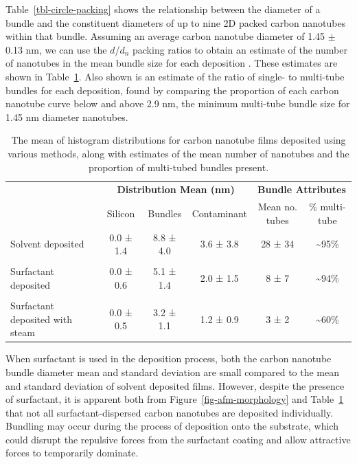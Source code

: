\documentclass[
  a4paper,
]{scrbook}
\begin{document}
Table~\ref{tbl-circle-packing} shows the relationship between the
diameter of a bundle and the constituent diameters of up to nine 2D
packed carbon nanotubes within that bundle. Assuming an average carbon
nanotube diameter of 1.45 \(\pm\) 0.13 nm, we can use the \(d\)/\(d_n\)
packing ratios to obtain an estimate of the number of nanotubes in the
mean bundle size for each deposition \autocite{Specht2023}. These
estimates are shown in Table~\ref{tbl-histogram-parameters}. Also shown
is an estimate of the ratio of single- to multi-tube bundles for each
deposition, found by comparing the proportion of each carbon nanotube
curve below and above 2.9 nm, the minimum multi-tube bundle size for
1.45 nm diameter nanotubes.

\hypertarget{tbl-histogram-parameters}{}
\begin{table}
\caption{\label{tbl-histogram-parameters}The mean of histogram distributions for carbon nanotube films deposited
using various methods, along with estimates of the mean number of
nanotubes and the proportion of multi-tubed bundles present. }\tabularnewline

\centering
\begin{tabular}{>{\raggedright\arraybackslash}p{2cm}ccccc}
\toprule
\multicolumn{1}{c}{\textbf{ }} & \multicolumn{3}{c}{\textbf{Distribution Mean (nm)}} & \multicolumn{2}{c}{\textbf{Bundle Attributes}} \\
\cmidrule(l{3pt}r{3pt}){2-4} \cmidrule(l{3pt}r{3pt}){5-6}
 & Silicon & Bundles & Contaminant & Mean no. tubes & \% multi-tube\\
\midrule
Solvent deposited & 0.0 ± 1.4 & 8.8 ± 4.0 & 3.6 ± 3.8 & 28 ± 34 & \textasciitilde{}95\%\\
 &  &  &  &  \vphantom{1} & \\
Surfactant deposited & 0.0 ± 0.6 & 5.1 ± 1.4 & 2.0 ± 1.5 & 8  ± 7 & \textasciitilde{}94\%\\
 &  &  &  &  & \\
Surfactant deposited with steam & 0.0 ± 0.5 & 3.2 ± 1.1 & 1.2 ± 0.9 & 3 ± 2 & \textasciitilde{}60\%\\
\bottomrule
\end{tabular}
\end{table}

When surfactant is used in the deposition process, both the carbon
nanotube bundle diameter mean and standard deviation are small compared
to the mean and standard deviation of solvent deposited films. However,
despite the presence of surfactant, it is apparent both from
Figure~\ref{fig-afm-morphology} and Table~\ref{tbl-histogram-parameters}
that not all surfactant-dispersed carbon nanotubes are deposited
individually. Bundling may occur during the process of deposition onto
the substrate, which could disrupt the repulsive forces from the
surfactant coating and allow attractive forces to temporarily dominate.
\end{document}
